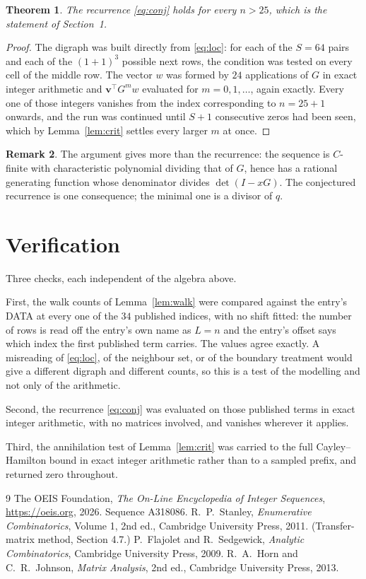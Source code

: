 \documentclass[11pt,a4paper]{article}
\theoremstyle{plain}
\newtheorem{theorem}{Theorem}
\theoremstyle{definition}
\newtheorem{remark}[theorem]{Remark}
\begin{document}
\begin{theorem}
The recurrence \eqref{eq:conj} holds for every $n>25$, which is the statement of
Section~1.
\end{theorem}

\begin{proof}
The digraph was built directly from \eqref{eq:loc}: for each of the $S=64$ pairs and each
of the $(1+1)^{3}$ possible next rows, the condition was tested on every cell of
the middle row. The vector $w$ was formed by $24$ applications of $G$ in exact integer
arithmetic and $\mathbf{v}^{\!\top}G^{m}w$ evaluated for $m=0,1,\dots$, again exactly.
Every one of those integers vanishes from the index corresponding to $n=25+1$ onwards,
and the run was continued until $S+1$ consecutive zeros had been seen, which by
Lemma~\ref{lem:crit} settles every larger $m$ at once.
\end{proof}

\begin{remark}
The argument gives more than the recurrence: the sequence is $C$-finite with characteristic
polynomial dividing that of $G$, hence has a rational generating function whose denominator
divides $\det(I-xG)$. The conjectured recurrence is one consequence; the minimal one is a
divisor of $q$.
\end{remark}

\section{Verification}

Three checks, each independent of the algebra above.

First, the walk counts of Lemma~\ref{lem:walk} were compared against the entry's DATA at
every one of the $34$ published indices, with no shift fitted: the number of rows is
read off the entry's own name as $L=n$ and the entry's offset says which index the first
published term carries. The values agree exactly. A misreading of \eqref{eq:loc}, of the
neighbour set, or of the boundary treatment would give a different digraph and different
counts, so this is a test of the modelling and not only of the arithmetic.

Second, the recurrence \eqref{eq:conj} was evaluated on those published terms in exact
integer arithmetic, with no matrices involved, and vanishes wherever it applies.

Third, the annihilation test of Lemma~\ref{lem:crit} was carried to the full
Cayley--Hamilton bound in exact integer arithmetic rather than to a sampled prefix, and
returned zero throughout.

\begin{thebibliography}{9}
 The OEIS Foundation, \emph{The On-Line Encyclopedia of Integer
Sequences}, \url{https://oeis.org}, 2026. Sequence A318086.
 R.~P.~Stanley, \emph{Enumerative Combinatorics}, Volume 1, 2nd ed.,
Cambridge University Press, 2011. (Transfer-matrix method, Section 4.7.)
 P.~Flajolet and R.~Sedgewick, \emph{Analytic Combinatorics}, Cambridge
University Press, 2009.
 R.~A.~Horn and C.~R.~Johnson, \emph{Matrix Analysis}, 2nd ed., Cambridge
University Press, 2013.
\end{thebibliography}
\end{document}
